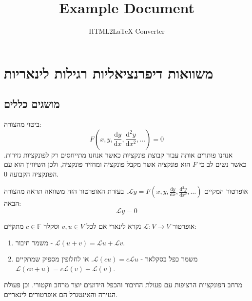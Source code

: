 \documentclass{tstextbook}
\begin{document}
\title{Example Document}
\author{HTML2LaTeX Converter}
\maketitle

\section{משוואות דיפרנציאליות רגילות לינאריות}

\subsection{מושגים כללים}

\begin{definition}
ביטוי מהצורה:
$$F\left( x,y,\frac{\mathrm{d} y}{\mathrm{d} x} ,\frac{\mathrm{d} ^2y}{\mathrm{d} x^{2}},\dots  \right)=0$$
אנחנו פותרים אותה עבור קבוצת פונקציות כאשר אנחנו מתייחסים רק לפונקציות גזירות. כאשר נשים לב כי \(F\) הוא פונקציה אשר מקבל פונקציה ומחזיר פונקציה, ולכן השיוויון הוא עם הפונקציה הקבועה 0.

\end{definition}
\begin{definition}
אופרטור המקיים \(\mathcal{L}y=F\left( x,y,\frac{\mathrm{d} y}{\mathrm{d} x} ,\frac{\mathrm{d} ^2y}{\mathrm{d} x^{2}},\dots  \right)\). בעזרת האופרטור הזה משוואה תראה מהצורה הבאה:
$$\mathcal{L}y=0$$

\end{definition}
\begin{reminder}
אופרטור \(\mathcal{L}:V\to V\) נקרא לינארי אם לכל \(v,u \in V\) וסקלר \(c \in \mathbb{F}\) מתקיים:

  \begin{enumerate}
    \item משמר חיבור - \(\mathcal{L}(u+v)=\mathcal{L}u+\mathcal{L}v\). 


    \item משמר כפל בסקלאר - \(\mathcal{L}(cu)=c\mathcal{L}u\). 
או לחלופין מספיק שמתקיים \(\mathcal{L}(cv+u)=c\mathcal{L}(v)+\mathcal{L}(u)\).


  \end{enumerate}
\end{reminder}
\begin{reminder}
מרחב הפונקציות הרציפות עם פעולת החיבור והכפל הידועים יוצר מרחב ווקטורי. וכן פעולת הגזירה והאינטגרל הם אופרטורים לינאריים.

\end{reminder}
\end{document}
